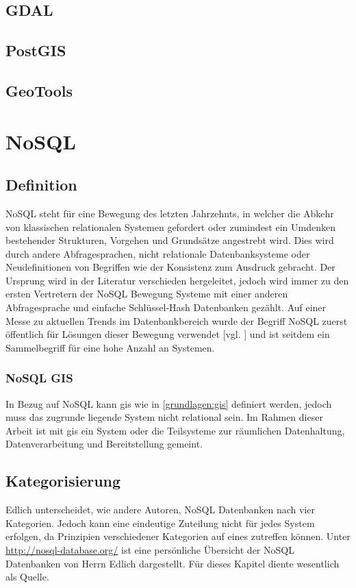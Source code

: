\subsection{GDAL}

\subsection{PostGIS}

\subsection{GeoTools}



\section{NoSQL}

\subsection{Definition}

NoSQL steht für eine Bewegung des letzten Jahrzehnts, in welcher die Abkehr von klassischen relationalen Systemen gefordert oder zumindest ein Umdenken bestehender Strukturen, Vorgehen und Grundsätze angestrebt wird.
Dies wird durch andere Abfragesprachen, nicht relationale Datenbanksysteme oder Neudefinitionen von Begriffen wie der Konsistenz zum Ausdruck gebracht.
Der Ursprung wird in der Literatur verschieden hergeleitet, jedoch wird immer zu den ersten Vertretern der NoSQL Bewegung Systeme mit einer anderen Abfragesprache und einfache Schlüssel-Hash Datenbanken gezählt.
Auf einer Messe zu aktuellen Trends im Datenbankbereich wurde der Begriff NoSQL zuerst öffentlich für Lösungen dieser Bewegung verwendet [vgl. \cite{website:originnosql}] und ist seitdem ein Sammelbegriff für eine hohe Anzahl an Systemen.

\subsubsection{NoSQL GIS}

In Bezug auf NoSQL kann \Gls{gis} wie in \ref{grundlagen:gis} definiert werden, jedoch muss das zugrunde liegende System nicht relational sein.
Im Rahmen dieser Arbeit ist mit \Gls{gis} ein System oder die Teilsysteme zur räumlichen Datenhaltung, Datenverarbeitung und Bereitstellung gemeint.

\subsection{Kategorisierung}
Edlich unterscheidet, wie andere Autoren, NoSQL Datenbanken nach vier Kategorien.
Jedoch kann eine eindeutige Zuteilung nicht für jedes System erfolgen, da Prinzipien verschiedener Kategorien auf eines zutreffen können.
Unter \url{http://nosql-database.org/} ist eine persönliche Übersicht der NoSQL Datenbanken von Herrn Edlich dargestellt.
Für dieses Kapitel diente wesentlich \cite{beamer:nosql} als Quelle.


